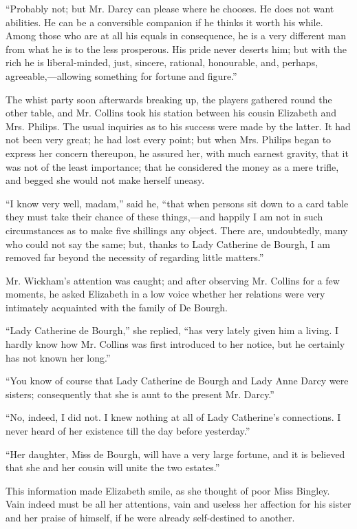 ``Probably not; but Mr. Darcy can please where he chooses. He does not want abilities. He can be a conversible companion if he thinks it worth his while. Among those who are at all his equals in consequence, he is a very different man from what he is to the less prosperous. His pride never deserts him; but with the rich he is liberal-minded, just, sincere, rational, honourable, and, perhaps, agreeable,---allowing something for fortune and figure.''

The whist party soon afterwards breaking up, the players gathered round the other table, and Mr. Collins took his station between his cousin Elizabeth and Mrs. Philips. The usual inquiries as to his success were made by the latter. It had not been very great; he had lost every point; but when Mrs. Philips began to express her concern thereupon, he assured her, with much earnest gravity, that it was not of the least importance; that he considered the money as a mere trifle, and begged she would not make herself uneasy.

``I know very well, madam,'' said he, ``that when persons sit down to a card table they must take their chance of these things,---and happily I am not in such circumstances as to make five shillings any object. There are, undoubtedly, many who could not say the same; but, thanks to Lady Catherine de Bourgh, I am removed far beyond the necessity of regarding little matters.''

Mr. Wickham's attention was caught; and after observing Mr. Collins for a few moments, he asked Elizabeth in a low voice whether her relations were very intimately acquainted with the family of De Bourgh.

``Lady Catherine de Bourgh,'' she replied, ``has very lately given him a living. I hardly know how Mr. Collins was first introduced to her notice, but he certainly has not known her long.''

``You know of course that Lady Catherine de Bourgh and Lady Anne Darcy were sisters; consequently that she is aunt to the present Mr. Darcy.''

``No, indeed, I did not. I knew nothing at all of Lady Catherine's connections. I never heard of her existence till the day before yesterday.''

``Her daughter, Miss de Bourgh, will have a very large fortune, and it is believed that she and her cousin will unite the two estates.''

This information made Elizabeth smile, as she thought of poor Miss Bingley. Vain indeed must be all her attentions, vain and useless her affection for his sister and her praise of himself, if he were already self-destined to another.

